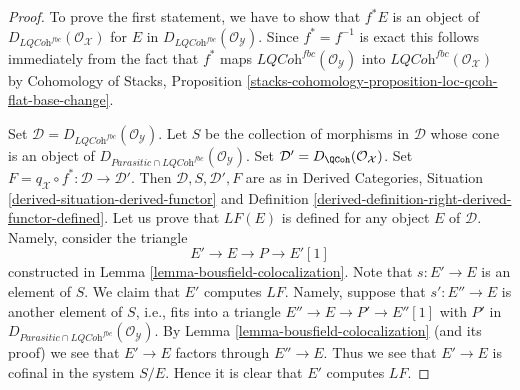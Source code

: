 \begin{proof}
To prove the first statement, we have to show that $f^*E$ is an object of
$D_{\textit{LQCoh}^{fbc}}(\mathcal{O}_\mathcal{X})$ for
$E$ in $D_{\textit{LQCoh}^{fbc}}(\mathcal{O}_\mathcal{Y})$.
Since $f^* = f^{-1}$ is exact this follows immediately from the fact that
$f^*$ maps $\textit{LQCoh}^{fbc}(\mathcal{O}_\mathcal{Y})$ into
$\textit{LQCoh}^{fbc}(\mathcal{O}_\mathcal{X})$ by
Cohomology of Stacks, Proposition
\ref{stacks-cohomology-proposition-loc-qcoh-flat-base-change}.

\medskip\noindent
Set $\mathcal{D} = D_{\textit{LQCoh}^{fbc}}(\mathcal{O}_\mathcal{Y})$.
Let $S$ be the collection of morphisms in $\mathcal{D}$
whose cone is an object of
$D_{\textit{Parasitic} \cap \textit{LQCoh}^{fbc}}(\mathcal{O}_\mathcal{Y})$.
Set $\mathcal{D}' = D_\QCoh(\mathcal{O}_\mathcal{X})$.
Set $F = q_\mathcal{X} \circ f^* : \mathcal{D} \to \mathcal{D}'$.
Then $\mathcal{D}, S, \mathcal{D}', F$ are as in
Derived Categories, Situation \ref{derived-situation-derived-functor} and
Definition \ref{derived-definition-right-derived-functor-defined}.
Let us prove that $LF(E)$ is defined for any object $E$ of $\mathcal{D}$.
Namely, consider the triangle
$$
E' \to E \to P \to E'[1]
$$
constructed in Lemma \ref{lemma-bousfield-colocalization}.
Note that $s : E' \to E$ is an element of $S$. We claim that $E'$ computes
$LF$. Namely, suppose that $s' : E'' \to E$ is another element of $S$, i.e.,
fits into a triangle $E'' \to E \to P' \to E''[1]$ with $P'$ in
$D_{\textit{Parasitic} \cap \textit{LQCoh}^{fbc}}(\mathcal{O}_\mathcal{Y})$.
By Lemma \ref{lemma-bousfield-colocalization} (and its proof)
we see that $E' \to E$ factors through $E'' \to E$. Thus we see that
$E' \to E$ is cofinal in the system $S/E$. Hence it is clear that
$E'$ computes $LF$.


\end{proof}
